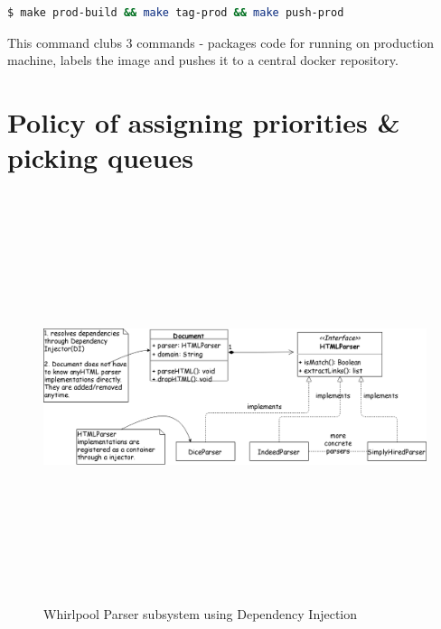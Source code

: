 \begin{lstlisting}[language=bash]
  $ make prod-build && make tag-prod && make push-prod
\end{lstlisting}
\noindent
This command clubs 3 commands - packages code for running on production machine, labels the image and pushes it to a central docker repository.

\pagebreak

\section{Policy of assigning priorities \& picking queues}
\begin{figure}[h!]
  \centering
  \includegraphics[width=15cm,height=12cm,keepaspectratio]{../media/crawler/docparsers.png}
  \caption{Whirlpool Parser subsystem using Dependency Injection}
  \label{fig:htmlparser}
\end{figure}

\pagebreak



